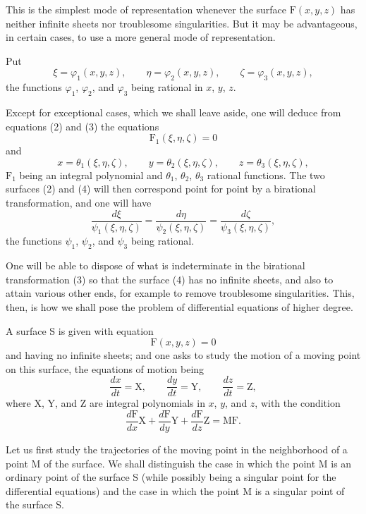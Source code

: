 \documentclass[11pt]{article}
\begin{document}
This is the simplest mode of representation whenever the surface $\mathrm{F}(x,y,z)$ has neither infinite sheets nor troublesome singularities. But it may be advantageous, in certain cases, to use a more general mode of representation.

Put
\begin{equation}\tag{3}
\xi=\varphi_1(x,y,z),\qquad
\eta=\varphi_2(x,y,z),\qquad
\zeta=\varphi_3(x,y,z),
\end{equation}
the functions $\varphi_1$, $\varphi_2$, and $\varphi_3$ being rational in $x$, $y$, $z$.

Except for exceptional cases, which we shall leave aside, one will deduce from equations (2) and (3) the equations
\begin{equation}\tag{4}
\mathrm{F}_1(\xi,\eta,\zeta)=0
\end{equation}
and
\begin{equation}\tag{5}
x=\theta_1(\xi,\eta,\zeta),\qquad
y=\theta_2(\xi,\eta,\zeta),\qquad
z=\theta_3(\xi,\eta,\zeta),
\end{equation}
$\mathrm{F}_1$ being an integral polynomial and $\theta_1$, $\theta_2$, $\theta_3$ rational functions. The two surfaces (2) and (4) will then correspond point for point by a birational transformation, and one will have
\[
\frac{d\xi}{\psi_1(\xi,\eta,\zeta)}
=
\frac{d\eta}{\psi_2(\xi,\eta,\zeta)}
=
\frac{d\zeta}{\psi_3(\xi,\eta,\zeta)},
\]
the functions $\psi_1$, $\psi_2$, and $\psi_3$ being rational.

One will be able to dispose of what is indeterminate in the birational transformation (3) so that the surface (4) has no infinite sheets, and also to attain various other ends, for example to remove troublesome singularities. This, then, is how we shall pose the problem of differential equations of higher degree.

A surface S is given with equation
\[
\mathrm{F}(x,y,z)=0
\]
and having no infinite sheets; and one asks to study the motion of a moving point on this surface, the equations of motion being
\[
\frac{dx}{dt}=\mathrm{X},
\qquad
\frac{dy}{dt}=\mathrm{Y},
\qquad
\frac{dz}{dt}=\mathrm{Z},
\]
where X, Y, and Z are integral polynomials in $x$, $y$, and $z$, with the condition
\[
\frac{d\mathrm{F}}{dx}\mathrm{X}+\frac{d\mathrm{F}}{dy}\mathrm{Y}+\frac{d\mathrm{F}}{dz}\mathrm{Z}=\mathrm{MF}.
\]

Let us first study the trajectories of the moving point in the neighborhood of a point M of the surface. We shall distinguish the case in which the point M is an ordinary point of the surface S (while possibly being a singular point for the differential equations) and the case in which the point M is a singular point of the surface S.
\end{document}
